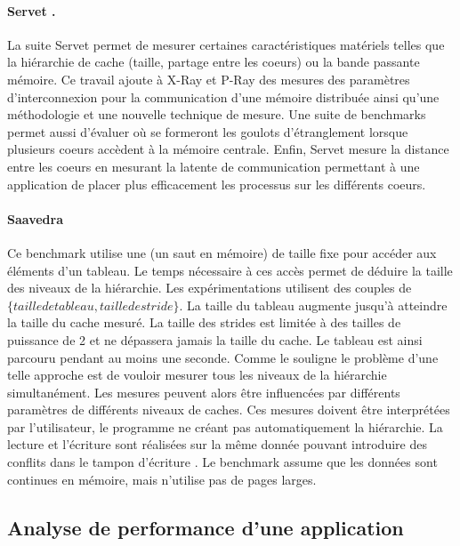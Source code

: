         \paragraph{Servet \cite{gonzalez2010servet}.} 
            La suite Servet permet de mesurer certaines caractéristiques matériels telles que la hiérarchie de cache (taille, partage entre les coeurs) ou la bande passante mémoire. Ce travail ajoute à X-Ray et P-Ray des mesures des paramètres d'interconnexion pour la communication d'une mémoire distribuée ainsi qu'une méthodologie et une nouvelle technique de mesure. Une suite de benchmarks permet aussi d'évaluer où se formeront les goulots d'étranglement lorsque plusieurs coeurs accèdent à la mémoire centrale. Enfin, Servet mesure la distance entre les coeurs en mesurant la latente de communication permettant à une application de placer plus efficacement les processus sur les différents coeurs.
               
        \paragraph{Saavedra \cite{Saavedra1995}} 
        
            Ce benchmark utilise une  (un saut en mémoire) de taille fixe pour accéder aux éléments d'un tableau. Le temps nécessaire à ces accès permet de déduire la taille des niveaux de la hiérarchie. Les expérimentations utilisent des couples de $\{taille de tableau, taille de stride\}$. La taille du tableau augmente jusqu'à atteindre la taille du cache mesuré. La taille des strides est limitée à des tailles de puissance de 2 et ne dépassera jamais la taille du cache. Le tableau est ainsi parcouru pendant au moins une seconde. Comme le souligne \cite{Yotov2005} le problème d'une telle approche est de vouloir mesurer tous les niveaux de la hiérarchie simultanément. Les mesures peuvent alors être influencées par différents paramètres de différents niveaux de caches. Ces mesures doivent être interprétées par l'utilisateur, le programme ne créant pas automatiquement la hiérarchie. La lecture et l'écriture sont réalisées sur la même donnée pouvant introduire des conflits dans le tampon d'écriture  \cite{Yotov2005}. Le benchmark assume que les données sont continues en mémoire, mais n'utilise pas de pages larges.

       
\subsection{Analyse de performance d'une application}\label{sec:profiling}

